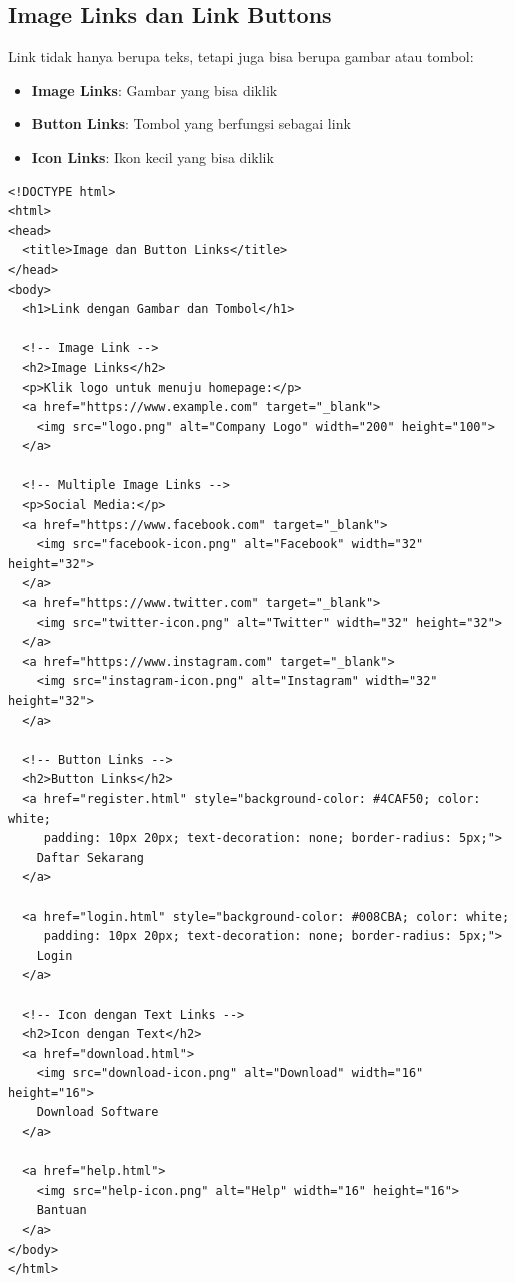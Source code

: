 \subsection{Image Links dan Link Buttons}

Link tidak hanya berupa teks, tetapi juga bisa berupa gambar atau tombol:

\begin{itemize}
  \item \textbf{Image Links}: Gambar yang bisa diklik
  \item \textbf{Button Links}: Tombol yang berfungsi sebagai link
  \item \textbf{Icon Links}: Ikon kecil yang bisa diklik
\end{itemize}

\begin{lstlisting}[caption={Image Links dan Button Links}, basicstyle=\ttfamily\small, frame=single]
<!DOCTYPE html>
<html>
<head>
  <title>Image dan Button Links</title>
</head>
<body>
  <h1>Link dengan Gambar dan Tombol</h1>
  
  <!-- Image Link -->
  <h2>Image Links</h2>
  <p>Klik logo untuk menuju homepage:</p>
  <a href="https://www.example.com" target="_blank">
    <img src="logo.png" alt="Company Logo" width="200" height="100">
  </a>
  
  <!-- Multiple Image Links -->
  <p>Social Media:</p>
  <a href="https://www.facebook.com" target="_blank">
    <img src="facebook-icon.png" alt="Facebook" width="32" height="32">
  </a>
  <a href="https://www.twitter.com" target="_blank">
    <img src="twitter-icon.png" alt="Twitter" width="32" height="32">
  </a>
  <a href="https://www.instagram.com" target="_blank">
    <img src="instagram-icon.png" alt="Instagram" width="32" height="32">
  </a>
  
  <!-- Button Links -->
  <h2>Button Links</h2>
  <a href="register.html" style="background-color: #4CAF50; color: white; 
     padding: 10px 20px; text-decoration: none; border-radius: 5px;">
    Daftar Sekarang
  </a>
  
  <a href="login.html" style="background-color: #008CBA; color: white; 
     padding: 10px 20px; text-decoration: none; border-radius: 5px;">
    Login
  </a>
  
  <!-- Icon dengan Text Links -->
  <h2>Icon dengan Text</h2>
  <a href="download.html">
    <img src="download-icon.png" alt="Download" width="16" height="16">
    Download Software
  </a>
  
  <a href="help.html">
    <img src="help-icon.png" alt="Help" width="16" height="16">
    Bantuan
  </a>
</body>
</html>
\end{lstlisting}

